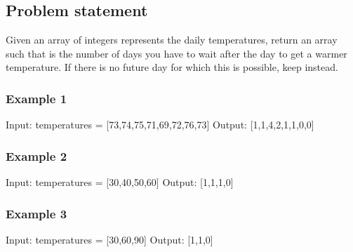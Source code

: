\documentclass[letterpaper,12pt,english]{book}
\begin{document}
\subsection{Problem statement\sphinxfootnotemark[14]}
\label{\detokenize{Array/01_ARR_739_Daily_Temperatures:problem-statement}}%
\begin{footnotetext}[14]\sphinxAtStartFootnote
{}
%
\end{footnotetext}\ignorespaces 
\sphinxAtStartPar
Given an array of integers  represents the daily temperatures, return an array  such that  is the number of days you have to wait after the  day to get a warmer temperature. If there is no future day for which this is possible, keep  instead.


\subsubsection{Example 1}
\label{\detokenize{Array/01_ARR_739_Daily_Temperatures:example-1}}
\begin{sphinxVerbatim}[commandchars=\\\{\}]
Input: temperatures = [73,74,75,71,69,72,76,73]
Output: [1,1,4,2,1,1,0,0]
\end{sphinxVerbatim}


\subsubsection{Example 2}
\label{\detokenize{Array/01_ARR_739_Daily_Temperatures:example-2}}
\begin{sphinxVerbatim}[commandchars=\\\{\}]
Input: temperatures = [30,40,50,60]
Output: [1,1,1,0]
\end{sphinxVerbatim}


\subsubsection{Example 3}
\label{\detokenize{Array/01_ARR_739_Daily_Temperatures:example-3}}
\begin{sphinxVerbatim}[commandchars=\\\{\}]
Input: temperatures = [30,60,90]
Output: [1,1,0]
\end{sphinxVerbatim}
\end{document}
